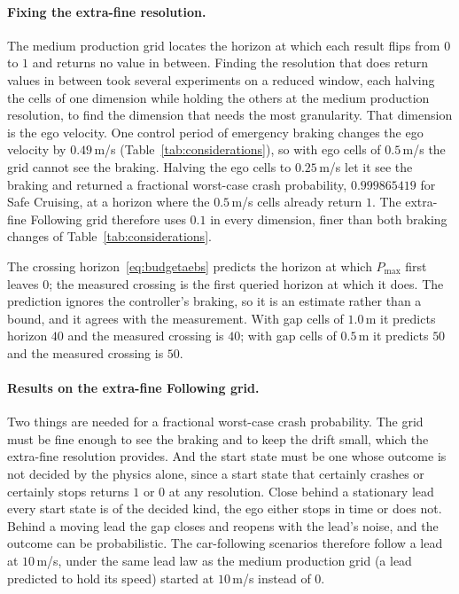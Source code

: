 \documentclass[11pt,a4paper]{article}
\theoremstyle{plain}
\theoremstyle{remark}
\begin{document}
	\paragraph{Fixing the extra-fine resolution.}
	\label{sec:cs:sweep}
	The medium production grid locates the horizon at which each result flips from $0$ to $1$ and returns no value in between. Finding the resolution that does return values in between took several experiments on a reduced window, each halving the cells of one dimension while holding the others at the medium production resolution, to find the dimension that needs the most granularity. That dimension is the ego velocity. One control period of emergency braking changes the ego velocity by $0.49$\,m/s (Table~\ref{tab:considerations}), so with ego cells of $0.5$\,m/s the grid cannot see the braking. Halving the ego cells to $0.25$\,m/s let it see the braking and returned a fractional worst-case crash probability, $0.999865419$ for Safe Cruising, at a horizon where the $0.5$\,m/s cells already return $1$. The extra-fine Following grid therefore uses $0.1$ in every dimension, finer than both braking changes of Table~\ref{tab:considerations}.
	
	The crossing horizon~\eqref{eq:budgetaebs} predicts the horizon at which $P_{\max}$ first leaves $0$; the measured crossing is the first queried horizon at which it does. The prediction ignores the controller's braking, so it is an estimate rather than a bound, and it agrees with the measurement. With gap cells of $1.0$\,m it predicts horizon $40$ and the measured crossing is $40$; with gap cells of $0.5$\,m it predicts $50$ and the measured crossing is $50$.
	
	
	\paragraph{Results on the extra-fine Following grid.}
	\label{sec:cs:extrafine}
	Two things are needed for a fractional worst-case crash probability. The grid must be fine enough to see the braking and to keep the drift small, which the extra-fine resolution provides. And the start state must be one whose outcome is not decided by the physics alone, since a start state that certainly crashes or certainly stops returns $1$ or $0$ at any resolution. Close behind a stationary lead every start state is of the decided kind, the ego either stops in time or does not. Behind a moving lead the gap closes and reopens with the lead's noise, and the outcome can be probabilistic. The car-following scenarios therefore follow a lead at $10$\,m/s, under the same lead law as the medium production grid (a lead predicted to hold its speed) started at $10$\,m/s instead of $0$.
	
\end{document}
